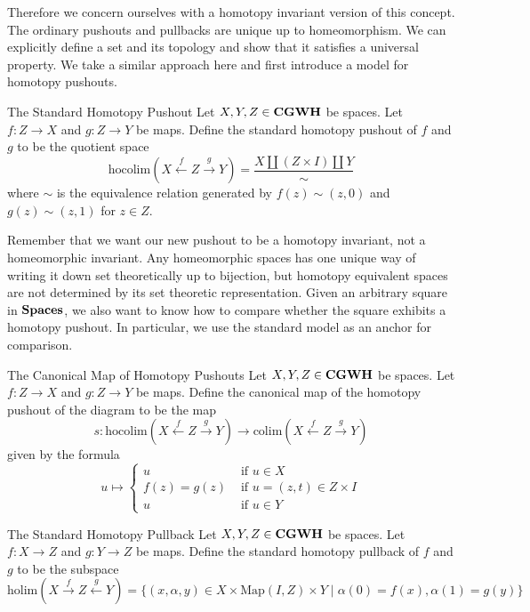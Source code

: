\documentclass[a4paper]{article}
\begin{document}
Therefore we concern ourselves with a homotopy invariant version of this concept. The ordinary pushouts and pullbacks are unique up to homeomorphism. We can explicitly define a set and its topology and show that it satisfies a universal property. We take a similar approach here and first introduce a model for homotopy pushouts. 

\begin{defn}{The Standard Homotopy Pushout}{} Let $X,Y,Z\in\bold{CGWH}$ be spaces. Let $f:Z\to X$ and $g:Z\to Y$ be maps. Define the standard homotopy pushout of $f$ and $g$ to be the quotient space $$\text{hocolim}(X\overset{f}{\leftarrow}Z\overset{g}{\rightarrow}Y)=\frac{X\amalg(Z\times I)\amalg Y}{\sim}$$ where $\sim$ is the equivalence relation generated by $f(z)\sim (z,0)$ and $g(z)\sim(z,1)$ for $z\in Z$. 
\end{defn}

Remember that we want our new pushout to be a homotopy invariant, not a homeomorphic invariant. Any homeomorphic spaces has one unique way of writing it down set theoretically up to bijection, but homotopy equivalent spaces are not determined by its set theoretic representation. Given an arbitrary square in $\bold{Spaces}$, we also want to know how to compare whether the square exhibits a homotopy pushout. In particular, we use the standard model as an anchor for comparison. 

\begin{defn}{The Canonical Map of Homotopy Pushouts}{} Let $X,Y,Z\in\bold{CGWH}$ be spaces. Let $f:Z\to X$ and $g:Z\to Y$ be maps. Define the canonical map of the homotopy pushout of the diagram to be the map $$s:\text{hocolim}(X\overset{f}{\leftarrow}Z\overset{g}{\rightarrow}Y)\to\text{colim}(X\overset{f}{\leftarrow}Z\overset{g}{\rightarrow}Y)$$ given by the formula $$u\mapsto\begin{cases}
u & \text{ if }u\in X\\
f(z)=g(z) & \text{ if }u=(z,t)\in Z\times I\\
u & \text{ if }u\in Y
\end{cases}$$
\end{defn}

\begin{defn}{The Standard Homotopy Pullback}{} Let $X,Y,Z\in\bold{CGWH}$ be spaces. Let $f:X\to Z$ and $g:Y\to Z$ be maps. Define the standard homotopy pullback of $f$ and $g$ to be the subspace $$\text{holim}(X\overset{f}{\rightarrow}Z\overset{g}{\leftarrow}Y)=\{(x,\alpha,y)\in X\times\text{Map}(I,Z)\times Y\;|\;\alpha(0)=f(x),\alpha(1)=g(y)\}$$
\end{defn}
\end{document}
